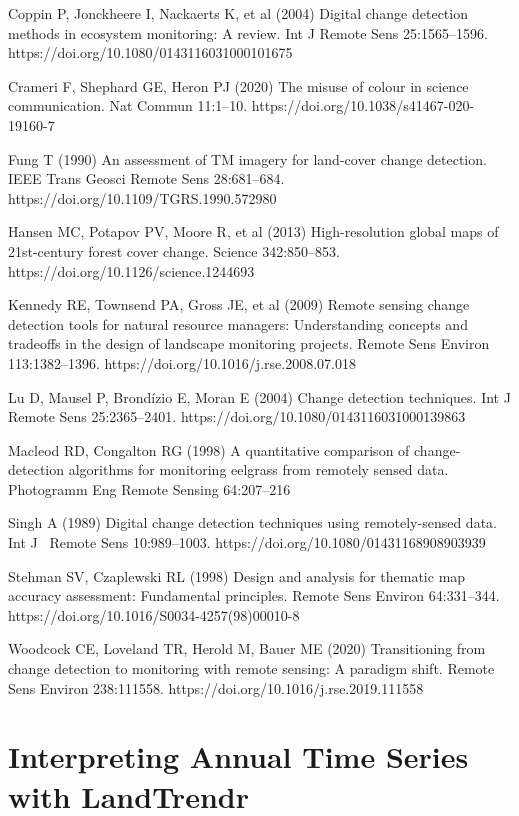 \documentclass[
  letterpaper,
  DIV=11,
  numbers=noendperiod]{scrreprt}
\begin{document}
Coppin P, Jonckheere I, Nackaerts K, et al (2004) Digital change
detection methods in ecosystem monitoring: A review. Int J Remote Sens
25:1565--1596. https://doi.org/10.1080/0143116031000101675

Crameri F, Shephard GE, Heron PJ (2020) The misuse of colour in science
communication. Nat Commun 11:1--10.
https://doi.org/10.1038/s41467-020-19160-7

Fung T (1990) An assessment of TM imagery for land-cover change
detection. IEEE Trans Geosci Remote Sens 28:681--684.
https://doi.org/10.1109/TGRS.1990.572980

Hansen MC, Potapov PV, Moore R, et al (2013) High-resolution global maps
of 21st-century forest cover change. Science 342:850--853.
https://doi.org/10.1126/science.1244693

Kennedy RE, Townsend PA, Gross JE, et al (2009) Remote sensing change
detection tools for natural resource managers: Understanding concepts
and tradeoffs in the design of landscape monitoring projects. Remote
Sens Environ 113:1382--1396. https://doi.org/10.1016/j.rse.2008.07.018

Lu D, Mausel P, Brondízio E, Moran E (2004) Change detection techniques.
Int J Remote Sens 25:2365--2401.
https://doi.org/10.1080/0143116031000139863

Macleod RD, Congalton RG (1998) A quantitative comparison of
change-detection algorithms for monitoring eelgrass from remotely sensed
data. Photogramm Eng Remote Sensing 64:207--216

Singh A (1989) Digital change detection techniques using remotely-sensed
data. Int J ~Remote Sens 10:989--1003.
https://doi.org/10.1080/01431168908903939

Stehman SV, Czaplewski RL (1998) Design and analysis for thematic map
accuracy assessment: Fundamental principles. Remote Sens Environ
64:331--344. https://doi.org/10.1016/S0034-4257(98)00010-8

Woodcock CE, Loveland TR, Herold M, Bauer ME (2020) Transitioning from
change detection to monitoring with remote sensing: A paradigm shift.
Remote Sens Environ 238:111558.
https://doi.org/10.1016/j.rse.2019.111558

\hypertarget{interpreting-annual-time-series-with-landtrendr}{%
\chapter{Interpreting Annual Time Series with
LandTrendr}\label{interpreting-annual-time-series-with-landtrendr}}
\end{document}
